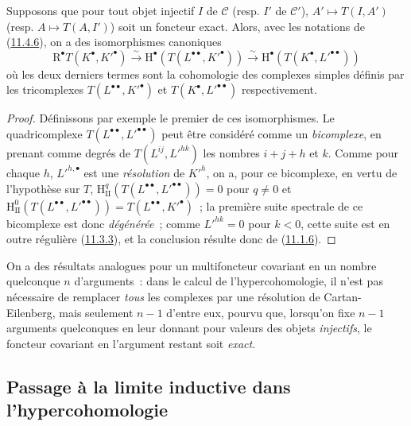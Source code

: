 \begin{proposition}[11.4.7]
\label{0.11.4.7-fr}
Supposons que pour tout objet injectif $I$ de $\mathcal C$ (resp. $I'$ de
$\mathcal C'$), $A'\mapsto T(I,A')$ (resp. $A\mapsto T(A,I')$) soit un
foncteur exact. Alors, avec les notations de
(\hyperref[0.11.4.6-fr]{11.4.6}), on a des isomorphismes canoniques
\[
  \label{0.11.4.7.1-fr}
  \mathrm R^\bullet T(K^\bullet,K'^\bullet)
  \xrightarrow{\sim}\mathrm H^\bullet(T(L^{\bullet\bullet},K'^\bullet))
  \xrightarrow{\sim}\mathrm H^\bullet(T(K^\bullet,L'^{\bullet\bullet}))
  \tag{11.4.7.1}
\]
où les deux derniers termes sont la cohomologie des complexes simples définis
par les tricomplexes $T(L^{\bullet\bullet},K'^\bullet)$ et
$T(K^\bullet,L'^{\bullet\bullet})$ respectivement.
\end{proposition}

\begin{proof}
Définissons par exemple le premier de ces isomorphismes. Le quadricomplexe
$T(L^{\bullet\bullet},L'^{\bullet\bullet})$ peut être considéré comme un
\emph{bicomplexe}, en prenant comme degrés de $T(L^{ij},L'^{hk})$ les nombres
$i+j+h$ et $k$. Comme pour chaque $h$, $L'^{h,\bullet}$ est une
\emph{résolution} de $K'^h$, on a, pour ce bicomplexe, en vertu de l'hypothèse
sur $T$,
$\mathrm H_{\mathrm{II}}^q(T(L^{\bullet\bullet},L'^{\bullet\bullet}))=0$
pour $q\neq0$ et
$\mathrm H_{\mathrm{II}}^0(T(L^{\bullet\bullet},L'^{\bullet\bullet}))
=T(L^{\bullet\bullet},K'^\bullet)$~; la première suite spectrale de ce
bicomplexe est donc \emph{dégénérée}~; comme $L'^{hk}=0$ pour $k<0$, cette
suite est en outre régulière (\hyperref[0.11.3.3-fr]{11.3.3}), et la
conclusion résulte donc de (\hyperref[0.11.1.6-fr]{11.1.6}).
\end{proof}

On a des résultats analogues pour un multifoncteur covariant en un nombre
quelconque $n$ d'arguments~: dans le calcul de l'hypercohomologie, il n'est pas
nécessaire de remplacer \emph{tous} les complexes par une résolution de
Cartan-Eilenberg, mais seulement $n-1$ d'entre eux, pourvu que, lorsqu'on fixe
$n-1$ arguments quelconques en leur donnant pour valeurs des objets
\emph{injectifs}, le foncteur covariant en l'argument restant soit
\emph{exact}.

\subsection{Passage à la limite inductive dans l'hypercohomologie}
\label{subsection:0.11.5-fr}

